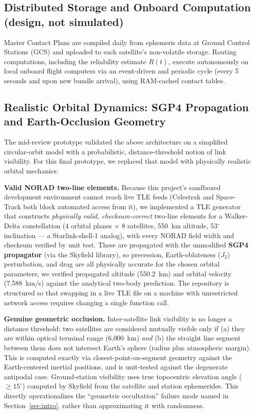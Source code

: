 \documentclass[10pt,twocolumn]{article}
\begin{document}
\subsection{Distributed Storage and Onboard Computation (design, not simulated)}
Master Contact Plans are compiled daily from ephemeris data at Ground Control Stations (GCS) and uploaded to each satellite's non-volatile storage. Routing computations, including the reliability estimate $R(t)$, execute autonomously on local onboard flight computers via an event-driven and periodic cycle (every 5 seconds and upon new bundle arrival), using RAM-cached contact tables.

\subsection{Realistic Orbital Dynamics: SGP4 Propagation and Earth-Occlusion Geometry}
\label{sec:realistic}

The mid-review prototype validated the above architecture on a simplified circular-orbit model with a probabilistic, distance-threshold notion of link visibility. For this final prototype, we replaced that model with physically realistic orbital mechanics:

\textbf{Valid NORAD two-line elements.} Because this project's sandboxed development environment cannot reach live TLE feeds (Celestrak and Space-Track both block automated access from it), we implemented a TLE generator that constructs \emph{physically valid, checksum-correct} two-line elements for a Walker-Delta constellation (4 orbital planes $\times$ 8 satellites, 550~km altitude, 53$^\circ$ inclination --- a Starlink-shell-1 analog), with every NORAD field width and checksum verified by unit test. These are propagated with the unmodified \textbf{SGP4 propagator} (via the Skyfield library), so precession, Earth-oblateness ($J_2$) perturbation, and drag are all physically accurate for the chosen orbital parameters; we verified propagated altitude (550.2~km) and orbital velocity (7.588~km/s) against the analytical two-body prediction. The repository is structured so that swapping in a live TLE file on a machine with unrestricted network access requires changing a single function call.

\textbf{Genuine geometric occlusion.} Inter-satellite link visibility is no longer a distance threshold: two satellites are considered mutually visible only if (a) they are within optical terminal range (6{,}000~km) \emph{and} (b) the straight line segment between them does not intersect Earth's sphere (radius plus atmospheric margin). This is computed exactly via closest-point-on-segment geometry against the Earth-centered inertial positions, and is unit-tested against the degenerate antipodal case. Ground-station visibility uses true topocentric elevation angle ($\geq 15^\circ$) computed by Skyfield from the satellite and station ephemerides. This directly operationalizes the ``geometric occultation'' failure mode named in Section~\ref{sec:intro}, rather than approximating it with randomness.
\end{document}

